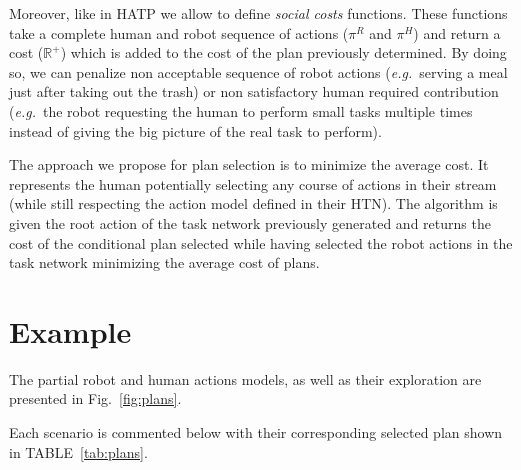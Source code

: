 Moreover, like in HATP we allow to define \textit{social costs} functions. These functions take a complete human and robot sequence of actions ($\pi^R$ and $\pi^H$) and return a cost ($\mathbb{R}^+$) which is added to the cost of the plan previously determined. By doing so, we can penalize non acceptable sequence of robot actions (\textit{e.g.}~serving a meal just after taking out the trash) or non satisfactory human required contribution (\textit{e.g.}~the robot requesting the human to perform small tasks multiple times instead of giving the big picture of the real task to perform).

The approach we propose for plan selection is to minimize the average cost. It represents the human potentially selecting any course of actions in their stream (while still respecting the action model defined in their HTN).
The algorithm is given the root action of the task network previously generated and returns the cost of the conditional plan selected while having selected the robot actions in the task network minimizing the average cost of plans.

\section{Example}

The partial robot and human actions models, as well as their exploration are presented in Fig.~\ref{fig:plans}.

Each scenario is commented below with their corresponding selected plan shown in TABLE~\ref{tab:plans}.

